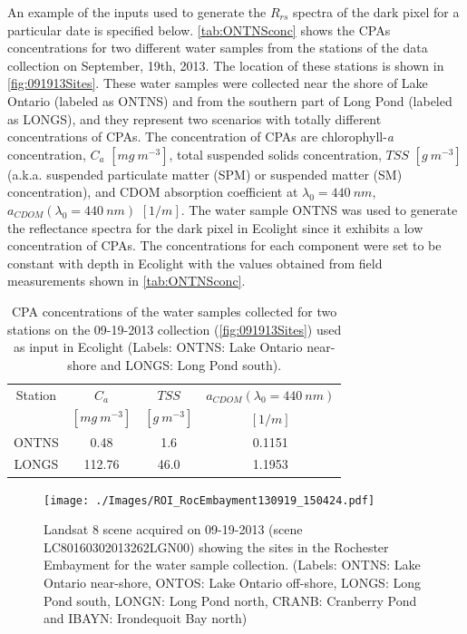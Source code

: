 \documentclass[onecolumn,3p,letterpaper,11pt]{elsarticle}
\begin{document}
An example of the inputs used to generate the $R_{rs}$ spectra of the dark pixel for a particular date is specified below. \autoref{tab:ONTNSconc} shows the CPAs concentrations for two different water samples from the stations of the data collection on September, 19th, 2013. The location of these stations is shown in \autoref{fig:091913Sites}. These water samples were collected near the shore of Lake Ontario (labeled as ONTNS) and from the southern part of Long Pond (labeled as LONGS), and they represent two scenarios with totally different concentrations of CPAs. The concentration of CPAs are chlorophyll-{\it a} concentration, $C_a$ $[mg~m^{-3}]$, total suspended solids concentration, $TSS$ $[g~m^{-3}]$ (a.k.a. suspended particulate matter (SPM) or suspended matter (SM) concentration), and CDOM absorption coefficient at $\lambda_0=440~nm$, $a_{CDOM}(\lambda_0=440~nm)$ $[1/m]$. The water sample ONTNS was used to generate the reflectance spectra for the dark pixel in Ecolight since it exhibits a low concentration of CPAs. The concentrations for each component were set to be constant with depth in Ecolight with the values obtained from field measurements shown in \autoref{tab:ONTNSconc}.

\begin{table}[htbp!]
\caption{ CPA concentrations of the water samples collected for two stations on the 09-19-2013 collection (\autoref{fig:091913Sites}) used as input in Ecolight (Labels: ONTNS: Lake Ontario near-shore and LONGS: Long Pond south). \label{tab:ONTNSconc} } 
\small
\centering
\begin{tabular}{c|c|c|c} 
 Station & \bfseries{$C_a$} & \bfseries{$TSS$} & \bfseries{$a_{CDOM}(\lambda_0=440~nm)$}\\
 & $[mg~m^{-3}]$ & $[g~m^{-3}]$ & $[1/m]$ \\ \hline \hline
ONTNS & 0.48   & 1.6  & 0.1151 \\ 
LONGS & 112.76 & 46.0 & 1.1953 \\ 
 \end{tabular}
\end{table}

\begin{figure}[htb]
  \centering
  \texttt{[image: ./Images/ROI\_RocEmbayment130919\_150424.pdf]}
  \caption{Landsat 8 scene acquired on 09-19-2013 (scene LC80160302013262LGN00) showing the sites in the Rochester Embayment for the water sample collection. (Labels: ONTNS: Lake Ontario near-shore, ONTOS: Lake Ontario off-shore, LONGS: Long Pond south, LONGN: Long Pond north, CRANB: Cranberry Pond and IBAYN: Irondequoit Bay north)\label{fig:091913Sites} } 
\end{figure}
\end{document}

